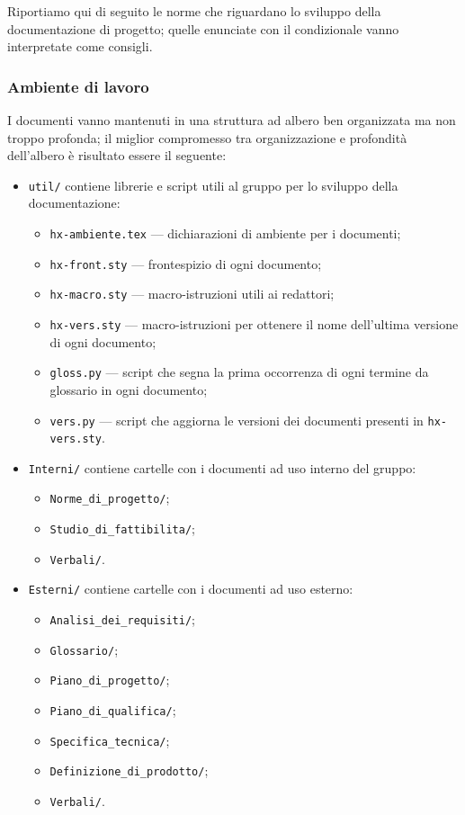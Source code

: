 Riportiamo qui di seguito le norme che riguardano lo sviluppo della documentazione di progetto; quelle enunciate con il condizionale vanno interpretate come consigli.

\subsubsection{Ambiente di lavoro} I documenti vanno mantenuti in una struttura ad albero ben organizzata ma non troppo profonda; il miglior compromesso tra organizzazione e profondità dell'albero è risultato essere il seguente:
\begin{itemize}
	\item \texttt{util/} contiene librerie e script utili al gruppo per lo sviluppo della documentazione:
	\begin{itemize}
		\item \texttt{hx-ambiente.tex} --- dichiarazioni di ambiente per i documenti;
		\item \texttt{hx-front.sty} --- frontespizio di ogni documento;
		\item \texttt{hx-macro.sty} --- macro-istruzioni utili ai redattori;
		\item \texttt{hx-vers.sty} --- macro-istruzioni per ottenere il nome dell'ultima versione di ogni documento;
		\item \texttt{gloss.py} --- script che segna la prima occorrenza di ogni termine da glossario in ogni documento;
		\item \texttt{vers.py} --- script che aggiorna le versioni dei documenti presenti in \texttt{hx-vers.sty}.
	\end{itemize}
	\item \texttt{Interni/} contiene cartelle con i documenti ad uso interno del gruppo:
	\begin{itemize}
		\item \texttt{Norme_di_progetto/};
		\item \texttt{Studio_di_fattibilita/};
		\item \texttt{Verbali/}.
	\end{itemize}
	\item \texttt{Esterni/} contiene cartelle con i documenti ad uso esterno:
	\begin{itemize}
		\item \texttt{Analisi_dei_requisiti/};
		\item \texttt{Glossario/};
		\item \texttt{Piano_di_progetto/};
		\item \texttt{Piano_di_qualifica/};
		\item \texttt{Specifica_tecnica/};
		\item \texttt{Definizione_di_prodotto/};
		\item \texttt{Verbali/}.
	\end{itemize}
\end{itemize}

